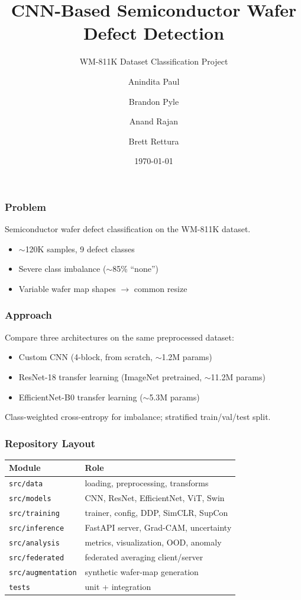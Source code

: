 \documentclass{beamer}
\title{CNN-Based Semiconductor Wafer Defect Detection}
\subtitle{WM-811K Dataset Classification Project}
\author{Anindita Paul \and Brandon Pyle \and Anand Rajan \and Brett Rettura}
\institute{AI 570 - Team 4}
\date{\today}
\begin{document}
\frame{\titlepage}

\begin{frame}
  \frametitle{Problem}
  Semiconductor wafer defect classification on the WM-811K dataset.

  \begin{itemize}
    \item $\sim$120K samples, 9 defect classes
    \item Severe class imbalance ($\sim$85\% ``none'')
    \item Variable wafer map shapes $\rightarrow$ common resize
  \end{itemize}
\end{frame}

\begin{frame}
  \frametitle{Approach}
  Compare three architectures on the same preprocessed dataset:

  \begin{itemize}
    \item Custom CNN (4-block, from scratch, $\sim$1.2M params)
    \item ResNet-18 transfer learning (ImageNet pretrained, $\sim$11.2M params)
    \item EfficientNet-B0 transfer learning ($\sim$5.3M params)
  \end{itemize}

  \vspace{0.3cm}
  Class-weighted cross-entropy for imbalance; stratified train/val/test split.
\end{frame}

\begin{frame}
  \frametitle{Repository Layout}
  \small
  \begin{center}
    \begin{tabular}{ll}
      \toprule
      Module & Role \\
      \midrule
      \texttt{src/data} & loading, preprocessing, transforms \\
      \texttt{src/models} & CNN, ResNet, EfficientNet, ViT, Swin \\
      \texttt{src/training} & trainer, config, DDP, SimCLR, SupCon \\
      \texttt{src/inference} & FastAPI server, Grad-CAM, uncertainty \\
      \texttt{src/analysis} & metrics, visualization, OOD, anomaly \\
      \texttt{src/federated} & federated averaging client/server \\
      \texttt{src/augmentation} & synthetic wafer-map generation \\
      \texttt{tests} & unit + integration \\
      \bottomrule
    \end{tabular}
  \end{center}
\end{frame}
\end{document}
